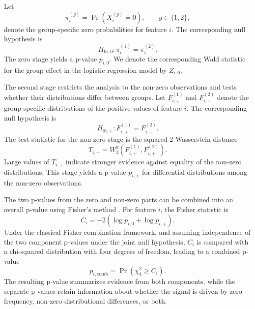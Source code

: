 Let
\begin{equation}
\label{eq:waddr_zero_prob}
\pi_i^{(g)} = \Pr\left(X_i^{(g)} = 0\right), \qquad g \in \{1,2\},
\end{equation}
denote the group-specific zero probabilities for feature $i$. The corresponding null hypothesis is
\begin{equation}
\label{eq:waddr_zero_null}
H_{0i,0}: \pi_i^{(1)} = \pi_i^{(2)}.
\end{equation}
The zero stage yields a p-value $p_{i,0}$. We denote the corresponding Wald statistic for the group effect in the logistic regression model by $Z_{i,0}$.

The second stage restricts the analysis to the non-zero observations and tests whether their distributions differ between groups. Let $F_{i,+}^{(1)}$ and $F_{i,+}^{(2)}$ denote the group-specific distributions of the positive values of feature $i$. The corresponding null hypothesis is
\begin{equation}
\label{eq:waddr_nonzero_null}
H_{0i,+}: F_{i,+}^{(1)} = F_{i,+}^{(2)}.
\end{equation}
The test statistic for the non-zero stage is the squared 2-Wasserstein distance
\begin{equation}
\label{eq:4feature:waddr_nonzero_statistic}
T_{i,+} = W_2^2\left(F_{i,+}^{(1)},F_{i,+}^{(2)}\right).
\end{equation}
Large values of $T_{i,+}$ indicate stronger evidence against equality of the non-zero distributions. This stage yields a p-value $p_{i,+}$ for differential distributions among the non-zero observations.

The two p-values from the zero and non-zero parts can be combined into an overall p-value using Fisher's method \citep{fisher1925statistical}. For feature $i$, the Fisher statistic is
\begin{equation}
\label{eq:waddr_fisher}
C_i = -2\left(\log p_{i,0} + \log p_{i,+}\right).
\end{equation}
Under the classical Fisher combination framework, and assuming independence of the two component p-values under the joint null hypothesis, $C_i$ is compared with a chi-squared distribution with four degrees of freedom, leading to a combined p-value
\begin{equation}
\label{eq:4feature:waddr_combined_pvalue}
p_{i,\mathrm{comb}} = \Pr\left(\chi^2_4 \geq C_i\right).
\end{equation}
The resulting p-value summarizes evidence from both components, while the separate p-values retain information about whether the signal is driven by zero frequency, non-zero distributional differences, or both.

